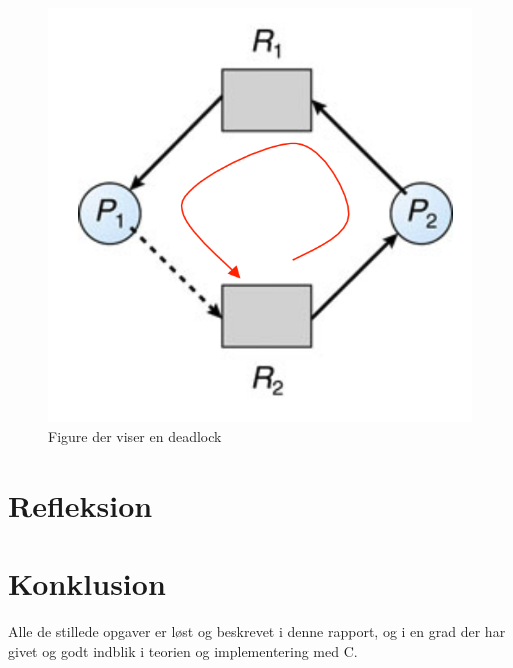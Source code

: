 \documentclass[danish]{report}
\begin{document}
\begin{figure}[H]
\begin{center}
\includegraphics[scale=0.4]{img/2.png}
\caption{Figure der viser en deadlock}
\label{fig:2}
\end{center}
\end{figure}


\chapter{Refleksion}


\chapter{Konklusion}

Alle de stillede opgaver er løst og beskrevet i denne rapport, og i en grad der har givet og godt indblik i teorien og implementering med C.
\end{document}
